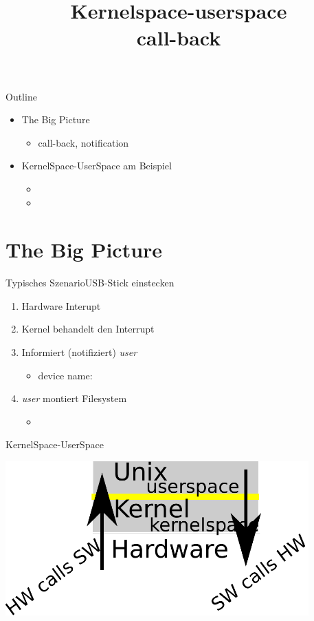 \documentclass{beamer}
\begin{document}
\newcommand{\ksp}{{\em kernel-space}\xspace}
\newcommand{\usp}{{\em user-space}\xspace}

\title[Kernel-User]{Kernelspace-userspace\\call-back}

\frame{\titlepage}

\begin{frame}{Outline}
 \begin{itemize}
  \item The Big Picture
  \begin{itemize}
   \item call-back, notification
  \end{itemize}
  \item \linux KernelSpace-UserSpace am Beispiel \targetS
  \begin{itemize}
   \item {}
   \item {}
  \end{itemize}
 \end{itemize}
\end{frame}

\section{The Big Picture}
\begin{frame}{Typisches Szenario}{USB-Stick einstecken}
 \begin{enumerate}
  \item Hardware Interupt
  \item Kernel behandelt den Interrupt
  \item Informiert (notifiziert) {\em user} 
  \begin{itemize}
   \item device name: 
  \end{itemize}
  \item {\em user}  montiert Filesystem 
  \begin{itemize}
   \item {}
  \end{itemize}
 \end{enumerate}
\end{frame}

\begin{frame}{KernelSpace-UserSpace}
\begin{center}
 \includegraphics[width=0.875\textwidth]{hw-calls-sw.pdf}
\end{center}
\end{frame}
\end{document}
